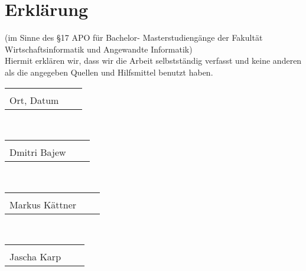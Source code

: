 \section*{Erklärung}

(im Sinne des \S 17 APO für Bachelor- Masterstudiengänge der Fakultät Wirtschaftsinformatik und Angewandte Informatik)\\
Hiermit erklären wir, dass wir die Arbeit selbstständig verfasst und keine anderen als die angegeben Quellen und Hilfsmittel benutzt haben.\vspace{1,5 cm}\\

\begin{tabular}{p{7cm}p{.5cm}l}
\dotfill \\ 
Ort, Datum
\end{tabular}\vspace{1,5 cm}\\%

\begin{tabular}{p{7cm}p{.5cm}l}
\dotfill \\ 
Dmitri Bajew
\end{tabular}\vspace{1,5 cm}\\%

\begin{tabular}{p{7cm}p{.5cm}l}
\dotfill \\ 
Markus Kättner
\end{tabular}\vspace{1,5 cm}\\%

\begin{tabular}{p{7cm}p{.5cm}l}
\dotfill \\ 
Jascha Karp
\end{tabular}
